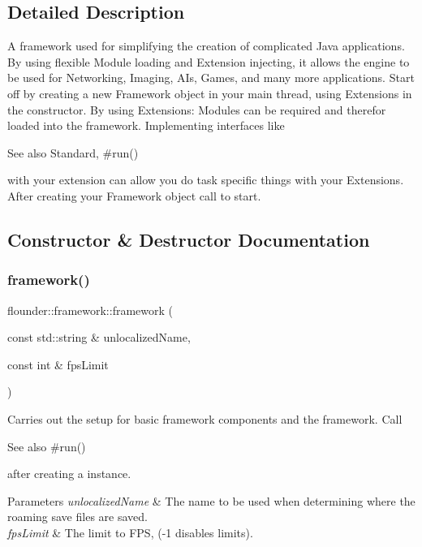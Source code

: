 \subsection{Detailed Description}
A framework used for simplifying the creation of complicated Java applications. By using flexible Module loading and Extension injecting, it allows the engine to be used for Networking, Imaging, A\+Is, Games, and many more applications. Start off by creating a new Framework object in your main thread, using Extensions in the constructor. By using Extensions\+: Modules can be required and therefor loaded into the framework. Implementing interfaces like \begin{DoxySeeAlso}{See also}
Standard, \#run()


\end{DoxySeeAlso}
with your extension can allow you do task specific things with your Extensions. After creating your Framework object call  to start. 



\subsection{Constructor \& Destructor Documentation}
\mbox{\label{classflounder_1_1framework_a65b26709246ffe005c7660752147edb9}} 
\subsubsection{\texorpdfstring{framework()}{framework()}}
{\footnotesize\ttfamily flounder\+::framework\+::framework (\begin{DoxyParamCaption}\item[{const std\+::string \&}]{unlocalized\+Name,  }\item[{const int \&}]{fps\+Limit }\end{DoxyParamCaption})}



Carries out the setup for basic framework components and the framework. Call \begin{DoxySeeAlso}{See also}
\#run()


\end{DoxySeeAlso}
after creating a instance. 


\begin{DoxyParams}{Parameters}
{\em unlocalized\+Name} & The name to be used when determining where the roaming save files are saved. \\
\hline
{\em fps\+Limit} & The limit to F\+PS, (-\/1 disables limits). \\
\hline
\end{DoxyParams}


